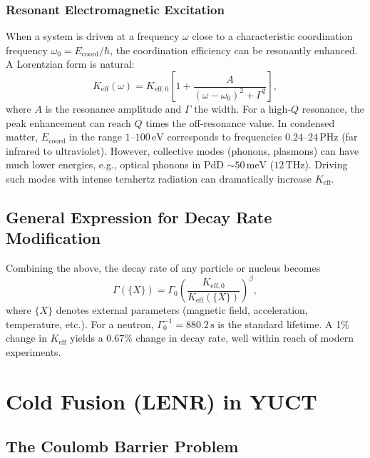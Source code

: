 \documentclass[12pt]{article}
\theoremstyle{remark}
\newcommand{\Keff}{K_{\mathrm{eff}}}
\newcommand{\Keffzero}{K_{\mathrm{eff},0}}
\begin{document}
	\subsubsection{Resonant Electromagnetic Excitation}
	
	When a system is driven at a frequency \(\omega\) close to a characteristic coordination frequency \(\omega_0 = E_{\mathrm{coord}}/\hbar\), the coordination efficiency can be resonantly enhanced. A Lorentzian form is natural:
	\begin{equation}
		\Keff(\omega) = \Keffzero \left[ 1 + \frac{A}{(\omega - \omega_0)^2 + \Gamma^2} \right],
		\label{eq:keff-omega}
	\end{equation}
	where \(A\) is the resonance amplitude and \(\Gamma\) the width. For a high‑\(Q\) resonance, the peak enhancement can reach \(Q\) times the off‑resonance value. In condensed matter, \(E_{\mathrm{coord}}\) in the range \(1\)–\(100\,\text{eV}\) corresponds to frequencies \(0.24\)–\(24\,\text{PHz}\) (far infrared to ultraviolet). However, collective modes (phonons, plasmons) can have much lower energies, e.g., optical phonons in PdD \(\sim 50\,\text{meV}\) (\(12\,\text{THz}\)). Driving such modes with intense terahertz radiation can dramatically increase \(\Keff\).
	
	\subsection{General Expression for Decay Rate Modification}
	
	Combining the above, the decay rate of any particle or nucleus becomes
	\begin{equation}
		\Gamma(\{X\}) = \Gamma_0 \left( \frac{\Keffzero}{\Keff(\{X\})} \right)^{\beta},
		\label{eq:general-rate}
	\end{equation}
	where \(\{X\}\) denotes external parameters (magnetic field, acceleration, temperature, etc.). For a neutron, \(\Gamma_0^{-1} = 880.2\,\text{s}\) is the standard lifetime. A 1\% change in \(\Keff\) yields a \(0.67\%\) change in decay rate, well within reach of modern experiments.
	
	\section{Cold Fusion (LENR) in YUCT}
	\label{sec:fusion}
	
	\subsection{The Coulomb Barrier Problem}
	
\end{document}
